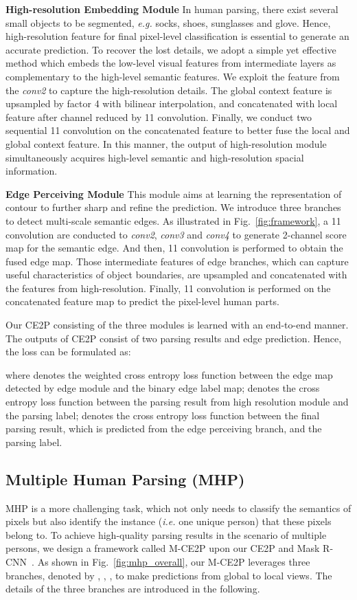 \documentclass[letterpaper]{article} \usepackage{formatting-instructions-latex-2019}  \usepackage{times}  \usepackage{helvet}  \usepackage{courier}  \usepackage{url}  \usepackage{graphicx}  \frenchspacing  \setlength{\pdfpagewidth}{8.5in}  \setlength{\pdfpageheight}{11in}
\newcommand{\eg}{\emph{e.g. }}
\newcommand{\ie}{\emph{i.e. }}
\begin{document}
\noindent \textbf{High-resolution Embedding Module}
In human parsing, there exist several small objects to be segmented, \eg socks, shoes, sunglasses and glove. Hence, high-resolution feature for final pixel-level classification is essential to generate an accurate prediction. To recover the lost details, we adopt a simple yet effective method which embeds the low-level visual features from intermediate layers as complementary to the high-level semantic features. We exploit the feature from the \emph{conv2} to capture the high-resolution details. The global context feature is upsampled by factor 4 with bilinear interpolation, and concatenated with local feature after channel reduced by 11 convolution. Finally, we conduct two sequential 11 convolution on the concatenated feature to better fuse the local and global context feature. In this manner, the output of high-resolution module simultaneously acquires high-level semantic and high-resolution spacial information.       

\noindent \textbf{Edge Perceiving Module}
This module aims at learning the representation of contour to further sharp and refine the prediction. We introduce three branches to detect multi-scale semantic edges. As illustrated in Fig.~\ref{fig:framework}, a 11 convolution are conducted to \emph{conv2}, \emph{conv3} and \emph{conv4} to generate 2-channel score map for the semantic edge. And then, 11 convolution is performed to obtain the fused edge map. Those intermediate features of edge branches, which can capture useful characteristics of object boundaries, are upsampled and concatenated with the features from high-resolution. Finally, 11 convolution is performed on the concatenated feature map to predict the pixel-level human parts.      

Our CE2P consisting of the three modules is learned with an end-to-end manner. The outputs of CE2P consist of two parsing results and edge prediction. Hence, the loss can be formulated as:


where  denotes the weighted cross entropy loss function between the edge map detected by edge module and the binary edge label map;  denotes the cross entropy loss function between the parsing result from high resolution module and the parsing label;  denotes the cross entropy loss function between the final parsing result, which is predicted from the edge perceiving branch, and the parsing label.




\subsection{Multiple Human Parsing (MHP)}
MHP is a more challenging task, which not only needs to classify the semantics of pixels but also identify the instance (\ie one unique person) that these pixels belong to. To achieve high-quality parsing results in the scenario of multiple persons, we design a framework called M-CE2P upon our CE2P and Mask R-CNN~\cite{he2017mask}. As shown in Fig.~\ref{fig:mhp_overall}, our M-CE2P leverages three branches, denoted by , , , to make predictions from global to local views. The details of the three branches are introduced in the following.
\end{document}

